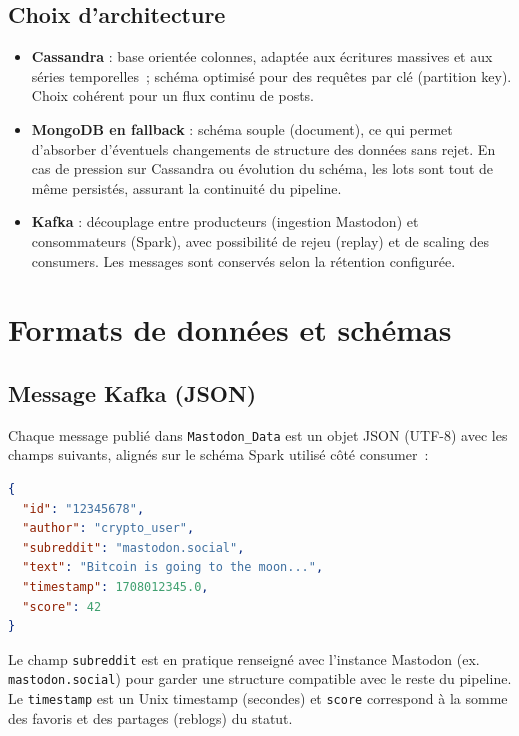 \documentclass[12pt,a4paper]{article}
\begin{document}
\subsection{Choix d'architecture}

\begin{itemize}[leftmargin=*]
  \item \textbf{Cassandra} : base orientée colonnes, adaptée aux écritures massives et aux séries temporelles~; schéma optimisé pour des requêtes par clé (partition key). Choix cohérent pour un flux continu de posts.
  \item \textbf{MongoDB en fallback} : schéma souple (document), ce qui permet d'absorber d'éventuels changements de structure des données sans rejet. En cas de pression sur Cassandra ou évolution du schéma, les lots sont tout de même persistés, assurant la continuité du pipeline.
  \item \textbf{Kafka} : découplage entre producteurs (ingestion Mastodon) et consommateurs (Spark), avec possibilité de rejeu (replay) et de scaling des consumers. Les messages sont conservés selon la rétention configurée.
\end{itemize}

\section{Formats de données et schémas}

\subsection{Message Kafka (JSON)}

Chaque message publié dans \texttt{Mastodon\_Data} est un objet JSON (UTF-8) avec les champs suivants, alignés sur le schéma Spark utilisé côté consumer~:

\begin{lstlisting}[language=json,caption=Exemple de message Kafka]
{
  "id": "12345678",
  "author": "crypto_user",
  "subreddit": "mastodon.social",
  "text": "Bitcoin is going to the moon...",
  "timestamp": 1708012345.0,
  "score": 42
}
\end{lstlisting}

Le champ \texttt{subreddit} est en pratique renseigné avec l'instance Mastodon (ex. \texttt{mastodon.social}) pour garder une structure compatible avec le reste du pipeline. Le \texttt{timestamp} est un Unix timestamp (secondes) et \texttt{score} correspond à la somme des favoris et des partages (reblogs) du statut.
\end{document}
